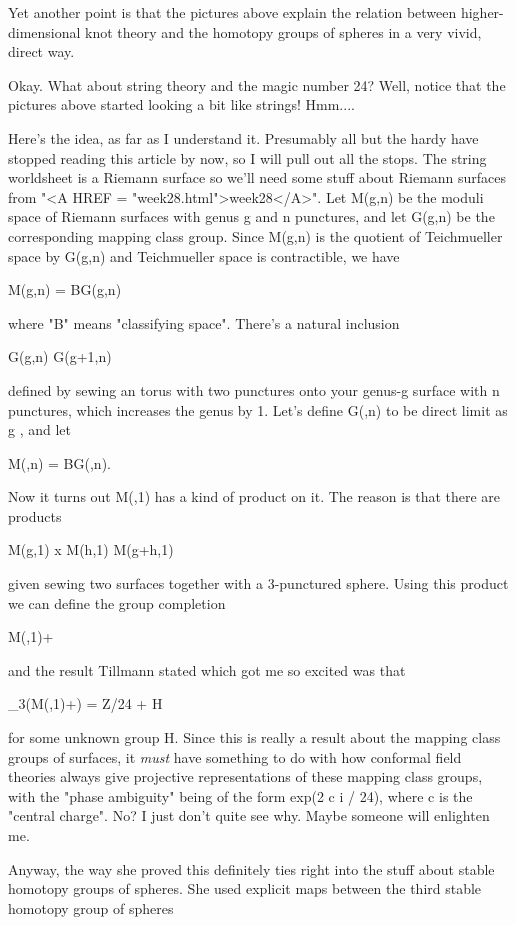 Yet another point is that the pictures above explain the relation
between higher-dimensional knot theory and the homotopy groups of
spheres in a very vivid, direct way.

Okay.  What about string theory and the magic number 24?  Well, notice
that the pictures above started looking a bit like strings!  Hmm....

Here's the idea, as far as I understand it.  Presumably all but the
hardy have stopped reading this article by now, so I will pull out all
the stops.  The string worldsheet is a Riemann surface so we'll need
some stuff about Riemann surfaces from "<A HREF = "week28.html">week28</A>".  Let M(g,n) be the
moduli space of Riemann surfaces with genus g and n punctures, and let
G(g,n) be the corresponding mapping class group.  Since M(g,n) is the
quotient of Teichmueller space by G(g,n) and Teichmueller space is
contractible, we have 

M(g,n) = BG(g,n)

where "B" means "classifying space".  There's a
natural inclusion

G(g,n) \to  G(g+1,n)

defined by sewing an torus with two punctures onto your genus-g surface
with n punctures, which increases the genus by 1.  Let's define
G(\infty ,n) to be direct limit as g \to  \infty , and let

M(\infty ,n) = BG(\infty ,n).  

Now it turns out M(\infty ,1) has a kind of product on it.  
The reason is that there are products

M(g,1) x M(h,1) \to  M(g+h,1)

given sewing two surfaces together with a 3-punctured sphere.
Using this product we can define the group completion 

M(\infty ,1)+

and the result Tillmann stated which got me so excited was
that 

\pi _{3}(M(\infty ,1)+) = Z/24 + H

for some unknown group H.  Since this is really a result about the
mapping class groups of surfaces, it \emph{must} have something to do with
how conformal field theories always give projective representations of
these mapping class groups, with the "phase ambiguity" being
of the form exp(2 \pi  c i / 24), where c is the "central charge".  
No?  I just don't quite see why.  Maybe someone
will enlighten me.

Anyway, the way she proved this definitely ties right into the stuff
about stable homotopy groups of spheres.  She used explicit maps between
the third stable homotopy group of spheres

